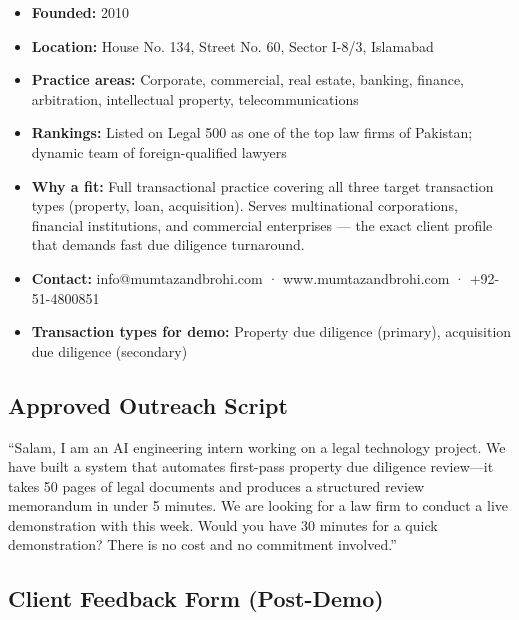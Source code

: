 \documentclass[12pt, a4paper]{article}
\begin{document}
\begin{itemize}[leftmargin=1.5cm]
    \item \textbf{Founded:} 2010
    \item \textbf{Location:} House No. 134, Street No. 60,
    Sector I-8/3, Islamabad
    \item \textbf{Practice areas:} Corporate, commercial, real estate,
    banking, finance, arbitration, intellectual property,
    telecommunications
    \item \textbf{Rankings:} Listed on Legal 500 as one of the top
    law firms of Pakistan; dynamic team of foreign-qualified lawyers
    \item \textbf{Why a fit:} Full transactional practice covering all
    three target transaction types (property, loan, acquisition).
    Serves multinational corporations, financial institutions, and
    commercial enterprises --- the exact client profile that demands
    fast due diligence turnaround.
    \item \textbf{Contact:} info@mumtazandbrohi.com · www.mumtazandbrohi.com
    · +92-51-4800851
    \item \textbf{Transaction types for demo:} Property due diligence
    (primary), acquisition due diligence (secondary)
\end{itemize}

\subsection{Approved Outreach Script}

\begin{scriptbox}
``Salam, I am an AI engineering intern working on a legal technology project.
We have built a system that automates first-pass property due diligence
review---it takes 50 pages of legal documents and produces a structured review
memorandum in under 5 minutes. We are looking for a law firm to conduct a live
demonstration with this week. Would you have 30 minutes for a quick
demonstration? There is no cost and no commitment involved.''
\end{scriptbox}

\subsection{Client Feedback Form (Post-Demo)}
\end{document}

